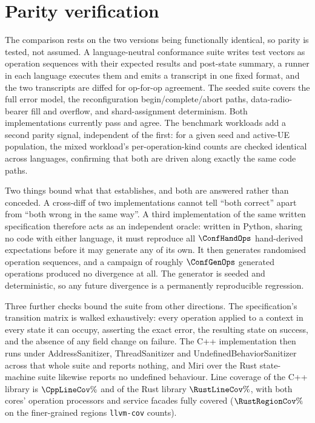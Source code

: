 \section{Parity verification}
\label{sec:parity}
The comparison rests on the two versions being functionally identical, so parity is tested, not
assumed. A language-neutral conformance suite writes test vectors as operation sequences with
their expected results and post-state summary, a runner in each language executes them and emits a
transcript in one fixed format, and the two transcripts are diffed for op-for-op agreement. The
seeded suite covers the full error model, the reconfiguration begin/complete/abort paths,
data-radio-bearer fill and overflow, and shard-assignment determinism. Both implementations
currently pass and agree. The benchmark workloads add a second parity signal, independent of the
first: for a given seed and active-UE population, the mixed workload's per-operation-kind counts
are checked identical across languages, confirming that both are driven along exactly the same
code paths.

Two things bound what that establishes, and both are answered rather than conceded. A cross-diff
of two implementations cannot tell ``both correct'' apart from ``both wrong in the same way''. A
third implementation of the same written specification therefore acts as an independent oracle:
written in Python, sharing no code with either language, it must reproduce all $\ConfHandOps$
hand-derived expectations before it may generate any of its own. It then generates randomised
operation sequences, and a campaign of roughly $\ConfGenOps$ generated operations produced no
divergence at all. The generator is seeded and deterministic, so any future divergence is a
permanently reproducible regression.

Three further checks bound the suite from other directions. The specification's transition matrix
is walked exhaustively: every operation applied to a context in every state it can occupy,
asserting the exact error, the resulting state on success, and the absence of any field change on
failure. The C++ implementation then runs under AddressSanitizer, ThreadSanitizer and
UndefinedBehaviorSanitizer across that whole suite and reports nothing, and Miri over the Rust
state-machine suite likewise reports no undefined behaviour. Line coverage of the C++ library is
$\CppLineCov\%$ and of the Rust library $\RustLineCov\%$, with both cores' operation processors
and service facades fully covered ($\RustRegionCov\%$ on the finer-grained regions
\texttt{llvm-cov} counts).
